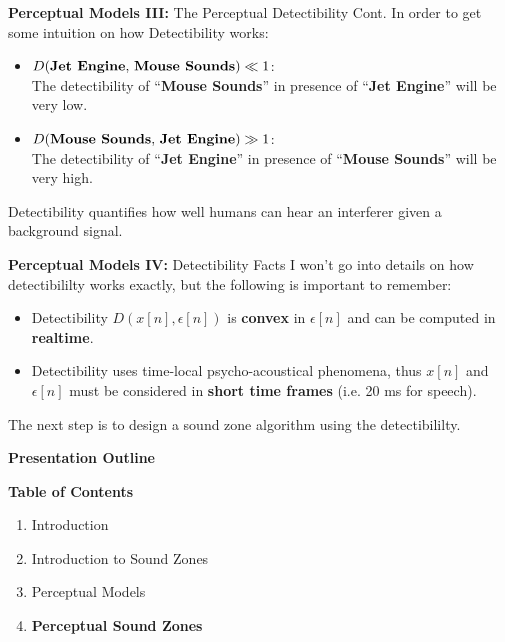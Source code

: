 \documentclass[aspectratio=169]{beamer}
\begin{document}
\begin{frame}{\textbf{Perceptual Models III:} The Perceptual Detectibility Cont.}
    In order to get some intuition on how Detectibility works:
    \begin{itemize}
        \item $D(\text{\textbf{Jet Engine}},\,\text{\textbf{Mouse Sounds}}) \ll 1$:\\The detectibility of ``\textbf{Mouse Sounds}'' in presence of ``\textbf{Jet Engine}'' will be very low.
        \item $D(\text{\textbf{Mouse Sounds}},\,\text{\textbf{Jet Engine}}) \gg 1$:\\The detectibility of ``\textbf{Jet Engine}'' in presence of ``\textbf{Mouse Sounds}'' will be very high. 
    \end{itemize}
    Detectibility quantifies how well humans can hear an interferer given a background signal.
\end{frame}

\begin{frame}{\textbf{Perceptual Models IV:} Detectibility Facts}
    I won't go into details on how detectibililty works exactly, but the following is important to remember:
    \begin{itemize}
        \item Detectibility $D(x[n],\epsilon[n])$  is \textbf{convex} in $\epsilon[n]$ and can be computed in \textbf{realtime}.
        \item Detectibility uses time-local psycho-acoustical phenomena, thus $x[n]$ and $\epsilon[n]$ must be considered in \textbf{short time frames} (i.e. 20 ms for speech).
    \end{itemize}
    The next step is to design a sound zone algorithm using the detectibililty. 
\end{frame}

\begin{frame}{\textbf{Presentation Outline}}
    \begin{block}{\textbf{Table of Contents}}
        \begin{enumerate}
            \item Introduction
            \item Introduction to Sound Zones
            \item Perceptual Models 
            \item \textbf{Perceptual Sound Zones}
        \end{enumerate} 
    \end{block}
\end{frame}
\end{document}
